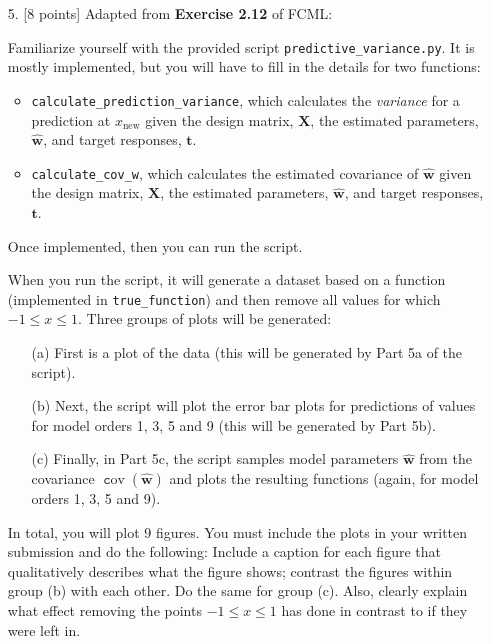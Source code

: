 \documentclass[10pt]{article}
\DeclareMathOperator{\cov}{\texttt cov}
\begin{document}
\begin{itemize}
\item[5.] [8 points]
Adapted from {\bf Exercise 2.12} of FCML:

Familiarize yourself with the provided script {\tt predictive\_variance.py}.  
It is mostly implemented, but you will have to fill in the details for two functions: 
\begin{itemize}
\item {\tt calculate\_prediction\_variance}, which calculates the {\em variance} for a prediction at $x_{\mathrm{new}}$ given the design matrix, $\mathbf{X}$, the estimated parameters, $\mathbf{\hat{w}}$, and target responses, $\mathbf{t}$.
\item {\tt calculate\_cov\_w}, which calculates the estimated covariance of $\mathbf{\hat{w}}$ given the design matrix, $\mathbf{X}$, the estimated parameters, $\mathbf{\hat{w}}$, and target responses, $\mathbf{t}$.
\end{itemize}
Once implemented, then you can run the script.

When you run the script, it will generate a dataset based on a function (implemented in {\tt true\_function}) and then remove all values for which $-1 \leq x \leq 1$.  Three groups of plots will be generated:
\begin{enumerate}
\item[(a)] First is a plot of the data (this will be generated by Part 5a of the script).  
\item[(b)] Next, the script will plot the error bar plots for predictions of values for model orders 1, 3, 5 and 9 (this will be generated by Part 5b).  
\item[(c)] Finally, in Part 5c, the script samples model parameters $\mathbf{\hat{w}}$ from the covariance $\cov(\mathbf{\hat{w}})$ and plots the resulting functions (again, for model orders 1, 3, 5 and 9).
\end{enumerate}

In total, you will plot 9 figures. You must include the plots in your written submission and do the following: Include a caption for each figure that qualitatively describes what the figure shows; contrast the figures within group (b) with each other. Do the same for group (c).  Also, clearly explain what effect removing the points $-1 \leq x \leq 1$ has done in contrast to if they were left in.


\end{itemize}
\end{document}
